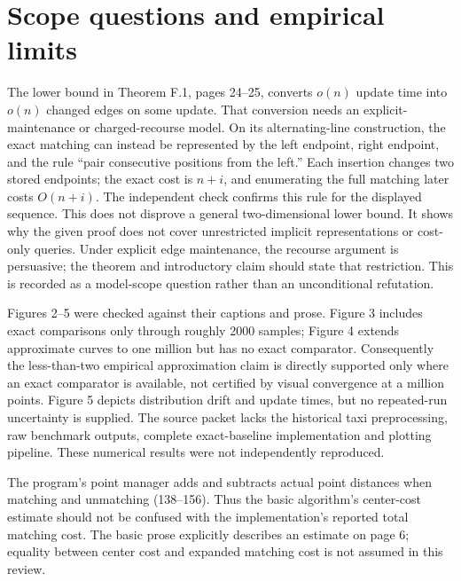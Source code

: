 \documentclass[10pt]{article}
\begin{document}
\section*{Scope questions and empirical limits}
The lower bound in Theorem F.1, pages 24–25, converts \(o(n)\) update time into \(o(n)\) changed edges on some update. That conversion needs an explicit-maintenance or charged-recourse model. On its alternating-line construction, the exact matching can instead be represented by the left endpoint, right endpoint, and the rule “pair consecutive positions from the left.” Each insertion changes two stored endpoints; the exact cost is \(n+i\), and enumerating the full matching later costs \(O(n+i)\). The independent check confirms this rule for the displayed sequence. This does not disprove a general two-dimensional lower bound. It shows why the given proof does not cover unrestricted implicit representations or cost-only queries. Under explicit edge maintenance, the recourse argument is persuasive; the theorem and introductory claim should state that restriction. This is recorded as a model-scope question rather than an unconditional refutation.\par
Figures 2–5 were checked against their captions and prose. Figure 3 includes exact comparisons only through roughly 2000 samples; Figure 4 extends approximate curves to one million but has no exact comparator. Consequently the less-than-two empirical approximation claim is directly supported only where an exact comparator is available, not certified by visual convergence at a million points. Figure 5 depicts distribution drift and update times, but no repeated-run uncertainty is supplied. The source packet lacks the historical taxi preprocessing, raw benchmark outputs, complete exact-baseline implementation and plotting pipeline. These numerical results were not independently reproduced.\par
The program’s point manager adds and subtracts actual point distances when matching and unmatching (138–156). Thus the basic algorithm’s center-cost estimate should not be confused with the implementation’s reported total matching cost. The basic prose explicitly describes an estimate on page 6; equality between center cost and expanded matching cost is not assumed in this review.\par
\end{document}
